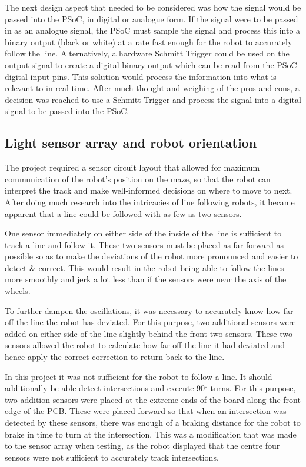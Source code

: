 \documentclass{article}
\begin{document}
The next design aspect that needed to be considered was how the signal would be passed into the PSoC, in digital or analogue form. If the signal were to be passed in as an analogue signal, the PSoC must sample the signal and process this into a binary output (black or white) at a rate fast enough for the robot to accurately follow the line. Alternatively, a hardware Schmitt Trigger could be used on the output signal to create a digital binary output which can be read from the PSoC digital input pins. This solution would process the information into what is relevant to in real time. After much thought and weighing of the pros and cons, a decision was reached to use a Schmitt Trigger and process the signal into a digital signal to be passed into the PSoC.

\subsection{Light sensor array and robot orientation}

The project required a sensor circuit layout that allowed for maximum communication of the robot’s position on the maze, so that the robot can interpret the track and make well-informed decisions on where to move to next. After doing much research into the intricacies of line following robots, it became apparent that a line could be followed with as few as two sensors.

One sensor immediately on either side of the inside of the line is sufficient to track a line and follow it. These two sensors must be placed as far forward as possible so as to make the deviations of the robot more pronounced and easier to detect \& correct. This would result in the robot being able to follow the lines more smoothly and jerk a lot less than if the sensors were near the axis of the wheels. 

To further dampen the oscillations, it was necessary to accurately know how far off the line the robot has deviated. For this purpose, two additional sensors were added on either side of the line slightly behind the front two sensors. These two sensors allowed the robot to calculate how far off the line it had deviated and hence apply the correct correction to return back to the line. 

In this project it was not sufficient for the robot to follow a line. It should additionally be able detect intersections and execute 90$^{\circ}$ turns. For this purpose, two addition sensors were placed at the extreme ends of the board along the front edge of the PCB. These were placed forward so that when an intersection was detected by these sensors, there was enough of a braking distance for the robot to brake in time to turn at the intersection. This was a modification that was made to the sensor array when testing, as the robot displayed that the centre four sensors were not sufficient to accurately track intersections.
\end{document}
